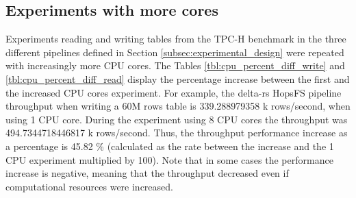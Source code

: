 \subsection{Experiments with more  cores}

Experiments reading and writing tables from the TPC-H benchmark in the three different pipelines defined in Section \ref{subsec:experimental_design} were repeated with increasingly more \gls{CPU} cores. The Tables \ref{tbl:cpu_percent_diff_write} and \ref{tbl:cpu_percent_diff_read} display the percentage increase between the first and the increased \gls{CPU} cores experiment. For example, the delta-rs \gls{HopsFS} pipeline throughput when writing a 60M rows table is 339.288979358 k rows/second, when using 1 \gls{CPU} core. During the experiment using 8 \gls{CPU} cores the throughput was 494.7344718446817 k rows/second. Thus, the throughput performance increase as a percentage is 45.82 \% (calculated as the rate between the increase and the 1 \gls{CPU} experiment multiplied by 100). Note that in some cases the performance increase is negative, meaning that the throughput decreased even if computational resources were increased.


